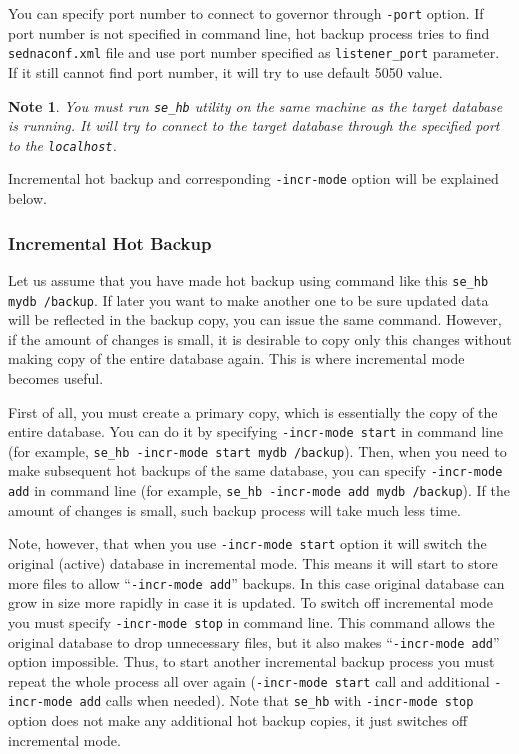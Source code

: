\documentclass[a4paper,12pt]{article}
\newtheorem{note}{Note}    %
\begin{document}
You can specify port number to connect to governor through \verb!-port! option.
If port number is not specified in command line, hot backup process tries to
find \verb!sednaconf.xml! file and use port number specified as
\verb!listener_port! parameter. If it still cannot find port number, it will try
to use default 5050 value.

\begin{note}
You must run \verb!se_hb! utility on the same machine as the target database is
running. It will try to connect to the target database through the specified
port to the \verb!localhost!.
\end{note}

Incremental hot backup and corresponding \verb!-incr-mode! option will be
explained below.


\subsubsection*{Incremental Hot Backup}

Let us assume that you have made hot backup using command like this
\verb!se_hb mydb /backup!. If later you want to make another one to be sure
updated data will be reflected in the backup copy, you can issue the same
command. However, if the amount of changes is small, it is desirable to copy
only this changes without making copy of the entire database again. This is
where incremental mode becomes useful.

First of all, you must create a primary copy, which is essentially the copy of
the entire database. You can do it by specifying \verb!-incr-mode start! in
command line (for example, \verb!se_hb -incr-mode start mydb /backup!). Then,
when you need to make subsequent hot backups of the same database, you can
specify \verb!-incr-mode add! in command line (for example,
\verb!se_hb -incr-mode add mydb /backup!). If the amount of changes is small,
such backup process will take much less time.

Note, however, that when you use \verb!-incr-mode start! option it will switch
the original (active) database in incremental mode. This means it will start to
store more files to allow ``\verb!-incr-mode add!'' backups. In this case
original database can grow in size more rapidly in case it is updated. To switch
off incremental mode you must specify \verb!-incr-mode stop! in command line.
This command allows the original database to drop unnecessary files, but it also
makes ``\verb!-incr-mode add!'' option impossible. Thus, to start another
incremental backup process you must repeat the whole process all over again
(\verb!-incr-mode start! call and additional \verb!-incr-mode add! calls when
needed). Note that \verb!se_hb! with \verb!-incr-mode stop! option does not make
any additional hot backup copies, it just switches off incremental mode.
\end{document}
